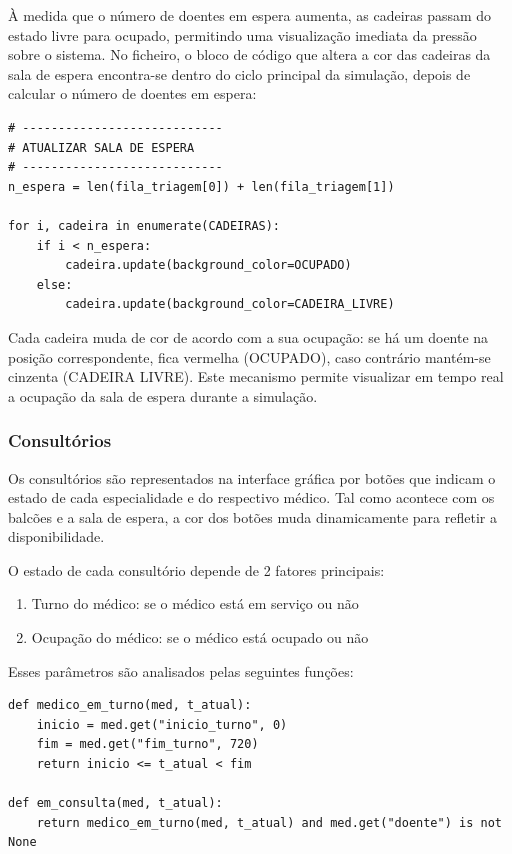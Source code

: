 \documentclass[12pt,a4paper]{article} %
\begin{document}
À medida que o número de doentes em espera aumenta, as cadeiras passam do estado livre para ocupado, permitindo uma visualização imediata da pressão sobre o sistema. No ficheiro, o bloco de código que altera a cor das cadeiras da sala de espera encontra-se dentro do ciclo principal da simulação, depois de calcular o número de doentes em espera:

\begin{verbatim}
# ----------------------------
# ATUALIZAR SALA DE ESPERA
# ----------------------------
n_espera = len(fila_triagem[0]) + len(fila_triagem[1])

for i, cadeira in enumerate(CADEIRAS):
    if i < n_espera:
        cadeira.update(background_color=OCUPADO)
    else:
        cadeira.update(background_color=CADEIRA_LIVRE)
\end{verbatim}

Cada cadeira muda de cor de acordo com a sua ocupação: se há um doente na posição correspondente, fica vermelha (OCUPADO), caso contrário mantém-se cinzenta (CADEIRA LIVRE). Este mecanismo permite visualizar em tempo real a ocupação da sala de espera durante a simulação.

\subsubsection{Consultórios}

Os consultórios são representados na interface gráfica por botões que indicam o estado de cada especialidade e do respectivo médico. Tal como acontece com os balcões e a sala de espera, a cor dos botões muda dinamicamente para refletir a disponibilidade.

O estado de cada consultório depende de 2 fatores principais:
\begin{enumerate}
    \item Turno do médico: se o médico está em serviço ou não
    \item Ocupação do médico: se o médico está ocupado ou não
\end{enumerate}

    Esses parâmetros são analisados pelas seguintes funções:
\begin{verbatim}
def medico_em_turno(med, t_atual):
    inicio = med.get("inicio_turno", 0)
    fim = med.get("fim_turno", 720)
    return inicio <= t_atual < fim

def em_consulta(med, t_atual):
    return medico_em_turno(med, t_atual) and med.get("doente") is not None
\end{verbatim}
\end{document}
